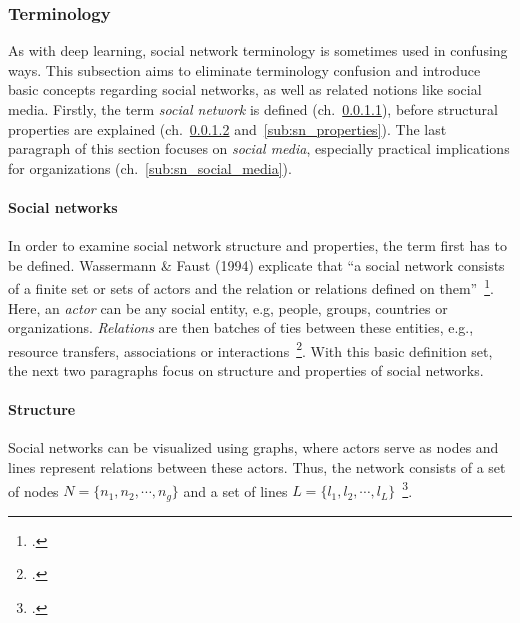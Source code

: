 \subsubsection{Terminology}
\label{sub:sn_terminology}

As with deep learning, social network terminology is sometimes used in confusing
ways.
This subsection aims to eliminate terminology confusion and introduce basic concepts regarding social networks,
as well as related notions like social media.
Firstly, the term \textit{social network} is defined (ch.~\ref{sub:sn_social_networks}), before structural
properties are explained (ch.~\ref{sub:sn_structure} and~\ref{sub:sn_properties}).
The last paragraph of this section focuses on \textit{social media}, especially
practical implications for organizations (ch.~\ref{sub:sn_social_media}).

\paragraph{Social networks}
\label{sub:sn_social_networks}

In order to examine social network structure and properties, the term first
has to be defined.
Wassermann \& Faust (1994) explicate that ``a social network consists of a finite
set or sets of actors and the relation or relations defined on them''~\footcite[20]{Wasserman1994}.
Here, an \textit{actor} can be any social entity, e.g, people, groups, countries or
organizations.
\textit{Relations} are then batches of ties between these entities, e.g., resource
transfers, associations or interactions~\footcite{Wasserman1994}.
With this basic definition set, the next two paragraphs focus on structure and
properties of social networks.

\paragraph{Structure}
\label{sub:sn_structure}

Social networks can be visualized using graphs, where actors serve as nodes
and lines represent relations between these actors.
Thus, the network consists of a set of nodes $N = \{n_1, n_2, \cdots, n_g\}$ and
a set of lines $L = \{l_1, l_2, \cdots, l_L\}$~\footcite{Wasserman1994}.

